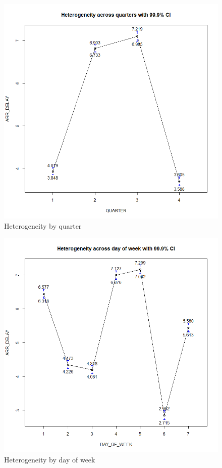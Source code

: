 \documentclass[12pt, a4paper, openany]{book}
\begin{document}
			\begin{figure}[h]
			\centering
			\includegraphics[width = 1\textwidth]{../figures/heterogeneity_quarters}
			\caption{Heterogeneity by quarter}
			\end{figure}

			\begin{figure}[h]
			\centering
			\includegraphics[width = 1 \textwidth]{../figures/heterogeneity_dayofweek}
			\caption{Heterogeneity by day of week}
			\end{figure}
\end{document}
